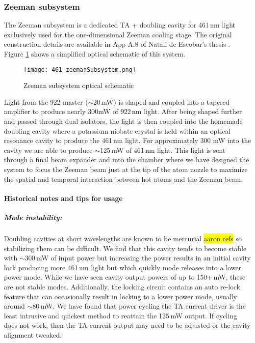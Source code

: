 \subsubsection{Zeeman subsystem}
The Zeeman subsystem is a dedicated TA + doubling cavity for 461\,nm light exclusively used for the one-dimensional Zeeman cooling stage.
The original construction details are available in App A.8 of Natali de Escobar's thesis \cite{MartinezdeEscolar2010}.
Figure \ref{fig:zeemanSchematic} shows a simplified optical schematic of this system.
	\begin{figure} 
		\centerline{
		\texttt{[image: 461\_zeemanSubsystem.png]}}
		\caption{Zeeman subsystem optical schematic}
		\label{fig:zeemanSchematic}
	\end{figure}
Light from the 922 master ($\sim$20\,mW) is shaped and coupled into a tapered amplifier to produce nearly 300\;mW of 922\,nm light.
After being shaped further and passed through dual isolators, the light is then coupled into the homemade doubling cavity where a potassium niobate crystal is held within an optical resonance cavity to produce the 461\,nm light.
For approximately 300 mW into the cavity we are able to produce $\sim$125\,mW of 461\,nm light.
This light is sent through a final beam expander and into the chamber where we have designed the system to focus the Zeeman beam just at the tip of the atom nozzle to maximize the spatial and temporal interaction between hot atoms and the Zeeman beam.

\paragraph{Historical notes and tips for usage}
\subparagraph{Mode instability:} 
Doubling cavities at short wavelengths are known to be mercurial \hl{aaron refs} so stabilizing them can be difficult. 
We find that this cavity tends to become stable with $\sim$300\,mW of input power but increasing the power results in an initial cavity lock producing more 461\,nm light but which quickly mode releases into a lower power mode.
While we have seen cavity output powers of up to 150+\,mW, these are not stable modes.
Additionally, the locking circuit contains an auto re-lock feature that can occasionally result in locking to a lower power mode, usually around $\sim$80\,mW.
We have found that power cycling the TA current driver is the least intrusive and quickest method to reattain the 125\,mW output.
If cycling does not work, then the TA current output may need to be adjusted or the cavity alignment tweaked.


